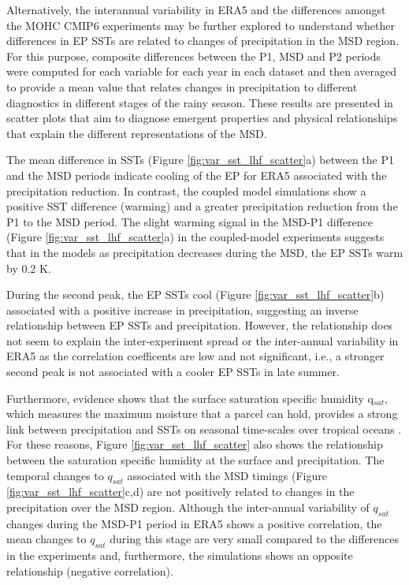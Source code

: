 Alternatively, the interannual variability in ERA5 and the differences amongst the MOHC CMIP6 experiments may be further explored to understand whether differences in EP SSTs are related to changes of precipitation in the MSD region. For this purpose, composite differences between the P1, MSD and P2 periods were computed for each variable for each year in each dataset and then averaged to provide a mean value that relates changes in precipitation to different diagnostics in different stages of the rainy season.  These results are presented in scatter plots that aim to diagnose emergent properties and physical relationships that explain the different representations of the MSD.

The mean difference in SSTs (Figure \ref{fig:var_sst_lhf_scatter}a) between the P1 and the MSD periods indicate cooling of the EP for ERA5 associated with the precipitation reduction. In contrast, the coupled model simulations show a positive SST difference (warming) and a greater precipitation reduction from the P1 to the MSD period.
The slight warming signal in the MSD-P1 difference (Figure \ref{fig:var_sst_lhf_scatter}a) in the coupled-model experiments suggests that in the models as precipitation decreases during the MSD, the EP SSTs warm by 0.2 K. 

During the second peak, the EP SSTs cool (Figure \ref{fig:var_sst_lhf_scatter}b) associated with a positive increase in precipitation, suggesting an inverse relationship between EP SSTs and precipitation. However, the relationship does not seem to explain the inter-experiment spread or the inter-annual variability in ERA5 as the correlation coefficents are low and not significant, i.e., a stronger second peak is not associated with a cooler EP SSTs in late summer. 


Furthermore, evidence shows that the surface saturation specific humidity q$_{sat}$, which measures the maximum moisture that a parcel can hold, provides a strong link between precipitation and SSTs on seasonal time-scales over tropical oceans \citep{yang2019,good2021}. For these reasons, Figure \ref{fig:var_sst_lhf_scatter} also shows the relationship between the saturation specific humidity at the surface and precipitation. The temporal changes to $q_{sat}$ associated with the MSD timings (Figure \ref{fig:var_sst_lhf_scatter}c,d) are not positively related to changes in the precipitation over the MSD region. Although the inter-annual variability of $q_{sat}$ changes during the MSD-P1  period in ERA5 shows a positive correlation, the mean changes to $q_{sat}$ during this stage are very small compared to the differences in the experiments and, furthermore, the simulations shows an opposite relationship (negative correlation). 

